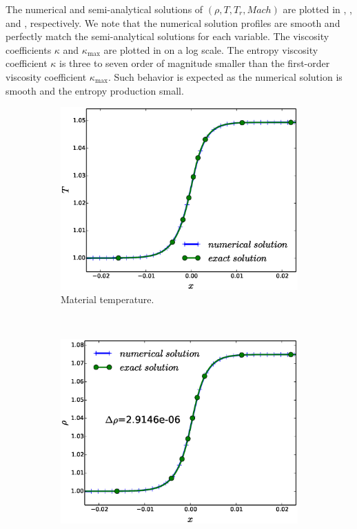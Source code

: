 \documentclass[times,doublespace]{fldauth}%
\begin{document}
The numerical and semi-analytical solutions of $(\rho, T, T_r, Mach)$ are plotted in , ,  and , respectively. We note that the numerical solution profiles are smooth and perfectly match the semi-analytical solutions for each variable. The viscosity coefficients $\kappa$ and $\kappa_\text{max}$ are plotted in  on a log scale. The entropy viscosity coefficient $\kappa$ is three to seven order of magnitude smaller than the first-order viscosity coefficient $\kappa_\text{max}$. Such behavior is expected as the numerical solution is smooth and the entropy production small.
%
\begin{figure}[h]
    \begin{subfigure}{0.32\textwidth}
    \centering
    \includegraphics[width=\linewidth]{figures/cst-xs/mach-1p05/mass-diff-mach-1p05-mat-temp-nel-250-plot.eps}
    \caption{Material temperature.}\label{fig:mach-1p05-cst-xs-temp}
    \end{subfigure}
    ~
    \begin{subfigure}{0.32\textwidth}
    \centering
    \includegraphics[width=\linewidth]{figures/cst-xs/mach-1p05/mass-diff-mach-1p05-density-nel-250-plot.eps}

\end{subfigure}
\end{figure}
\end{document}

